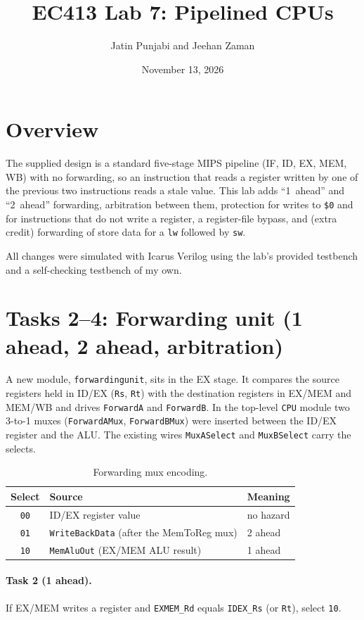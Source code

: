\documentclass[11pt,letterpaper]{article}
\title{EC413 Lab 7: Pipelined CPUs}
\author{Jatin Punjabi and Jeehan Zaman}
\date{November 13, 2026}
\newcommand{\code}[1]{\texttt{#1}}
\begin{document}
\maketitle

\section{Overview}
The supplied design is a standard five-stage MIPS pipeline (IF, ID, EX, MEM, WB) with no forwarding, so an instruction that reads a register written by one of the previous two instructions reads a stale value. This lab adds ``1~ahead'' and ``2~ahead'' forwarding, arbitration between them, protection for writes to \code{\$0} and for instructions that do not write a register, a register-file bypass, and (extra credit) forwarding of store data for a \code{lw} followed by \code{sw}.

All changes were simulated with Icarus Verilog using the lab's provided testbench and a self-checking testbench of my own.

\section{Tasks 2--4: Forwarding unit (1 ahead, 2 ahead, arbitration)}
A new module, \code{forwardingunit}, sits in the EX stage. It compares the source registers held in ID/EX (\code{Rs}, \code{Rt}) with the destination registers in EX/MEM and MEM/WB and drives \code{ForwardA} and \code{ForwardB}. In the top-level \code{CPU} module two 3-to-1 muxes (\code{ForwardAMux}, \code{ForwardBMux}) were inserted between the ID/EX register and the ALU. The existing wires \code{MuxASelect} and \code{MuxBSelect} carry the selects.

\begin{table}[H]\centering
\begin{tabular}{cll}\toprule
Select & Source & Meaning\\\midrule
\code{00} & ID/EX register value & no hazard\\
\code{01} & \code{WriteBackData} (after the MemToReg mux) & 2 ahead\\
\code{10} & \code{MemAluOut} (EX/MEM ALU result) & 1 ahead\\\bottomrule
\end{tabular}
\caption{Forwarding mux encoding.}
\end{table}

\paragraph{Task 2 (1 ahead).} If EX/MEM writes a register and \code{EXMEM\_Rd} equals \code{IDEX\_Rs} (or \code{Rt}), select \code{10}.
\end{document}
